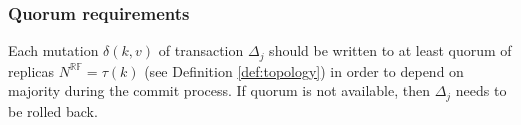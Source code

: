 \documentclass[runningheads,a4paper]{llncs}
\newcommand{\transactionj}{$\Delta_{j}$\xspace}
\newcommand{\insertMessage}{$\mathit{M}(c, n, \mathit{upsert(\text{\txState}, k,v)})$\xspace}
\newcommand{\mutation}[2]{$\delta(#1, #2)$\xspace}
\newcommand{\txState}{$\Lambda$\xspace}
\begin{document}
\subsubsection{Quorum requirements}
Each mutation \mutation{k}{v} of transaction \transactionj should be written to at least quorum of replicas $N^{\mathbb{RF}} = \tau(k)$ (see Definition \ref{def:topology}) in order to depend on majority during the commit process. If quorum is not available, then \transactionj needs to be rolled back. 





  
  
\end{document}

